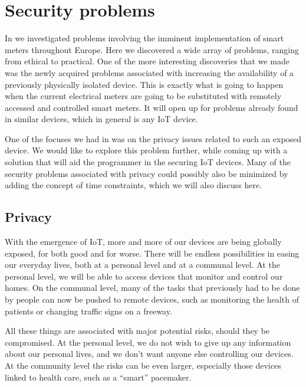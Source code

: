 
\section{Security problems}
In \cite{prespecialization} we investigated problems involving the imminent implementation of smart meters throughout Europe.
Here we discovered a wide array of problems, ranging from ethical to practical.
One of the more interesting discoveries that we made was the newly acquired problems associated with increasing the availability of a previously physically isolated device.
This is exactly what is going to happen when the current electrical meters are going to be substituted with remotely accessed and controlled smart meters.
It will open up for problems already found in similar devices, which in general is any IoT device.

One of the focuses we had in \cite{prespecialization} was on the privacy issues related to such an exposed device.
We would like to explore this problem further, while coming up with a solution that will aid the programmer in the securing IoT devices.
Many of the security problems associated with privacy could possibly also be minimized by adding the concept of time constraints, which we will also discuss here.

\subsection{Privacy}
With the emergence of IoT, more and more of our devices are being globally exposed, for both good and for worse.
There will be endless possibilities in easing our everyday lives, both at a personal level and at a communal level.
At the personal level, we will be able to access devices that monitor and control our homes.
On the communal level, many of the tasks that previously had to be done by people can now be pushed to remote devices, such as monitoring the health of patients or changing traffic signs on a freeway.

All these things are associated with major potential risks, should they be compromised.
At the personal level, we do not wish to give up any information about our personal lives, and we don't want anyone else controlling our devices.
At the community level the risks can be even larger, especially those devices linked to health care, such as a ``smart'' pacemaker.

